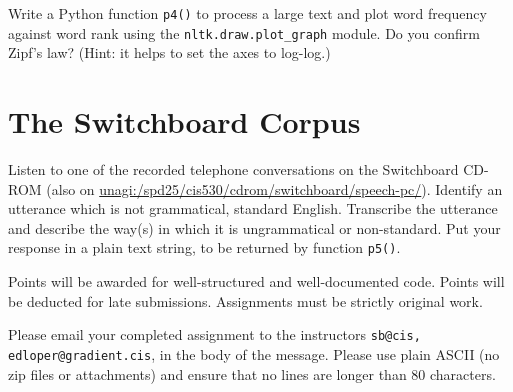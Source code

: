 \documentclass{cis530}
\begin{document}
Write a Python function \texttt{p4()}
to process a large text and plot word frequency
against word rank using the \texttt{nltk.draw.plot\_graph} module.
Do you confirm Zipf's law?  (Hint: it helps to
set the axes to log-log.)

\section{The Switchboard Corpus}

Listen to one of the recorded telephone conversations on the
Switchboard CD-ROM (also on
\url{unagi:/spd25/cis530/cdrom/switchboard/speech-pc/}).  Identify an
utterance which is not grammatical, standard English.  Transcribe the
utterance and describe the way(s) in which it is ungrammatical or
non-standard.  Put your response in a plain text string, to be returned
by function \texttt{p5()}.

Points will be awarded for well-structured and well-documented code.
Points will be deducted for late submissions.
Assignments must be strictly original work.

Please email your completed assignment to the instructors
\texttt{sb@cis, edloper@gradient.cis}, in the body of the message.
Please use plain ASCII (no zip files or attachments) and ensure
that no lines are longer than 80 characters.
\end{document}
